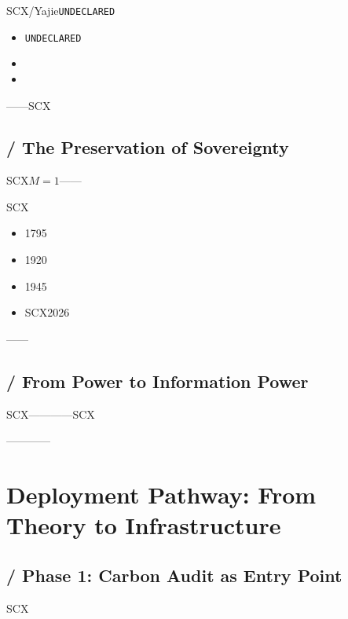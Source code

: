 \documentclass[12pt,a4paper]{article}
\theoremstyle{remark}
\newcommand{\UNDECLARED}{\texttt{UNDECLARED}}
\begin{document}
SCX/Yajie\UNDECLARED{}

\begin{itemize}[nosep]
    \item \UNDECLARED
    \item 
    \item 
\end{itemize}

——SCX

\subsection{ / The Preservation of Sovereignty}

SCX$M=1$——\textbf{}

SCX

\begin{itemize}[nosep]
    \item 1795
    \item 1920
    \item 1945
    \item SCX2026\textbf{}
\end{itemize}

\textbf{}——

\subsection{ / From Power to Information Power}

\textbf{}

SCX——\textbf{}——SCX

——\textbf{}——


\section{}
\section{Deployment Pathway: From Theory to Infrastructure}

\subsection{ / Phase 1: Carbon Audit as Entry Point}

SCX
\end{document}
